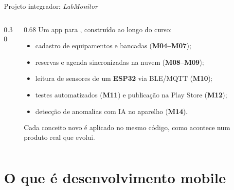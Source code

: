 \documentclass[aspectratio=169,10pt]{beamer}
\begin{document}
\begin{frame}{Projeto integrador: \emph{LabMonitor}}
  \begin{columns}[c]
    \begin{column}{0.30\textwidth}
      \centering
    \end{column}
    \begin{column}{0.68\textwidth}
      Um app para , construído ao longo do curso:
      \begin{itemize}
        \item cadastro de equipamentos e bancadas (\textbf{M04--M07});
        \item reservas e agenda sincronizadas na nuvem (\textbf{M08--M09});
        \item leitura de sensores de um \textbf{ESP32} via BLE/MQTT (\textbf{M10});
        \item testes automatizados (\textbf{M11}) e publicação na Play Store (\textbf{M12});
        \item detecção de anomalias com IA no aparelho (\textbf{M14}).
      \end{itemize}
      \begin{projeto}
        Cada conceito novo é aplicado no mesmo código, como acontece num produto real que evolui.
      \end{projeto}
    \end{column}
  \end{columns}
\end{frame}

\section{O que é desenvolvimento mobile}
\end{document}
